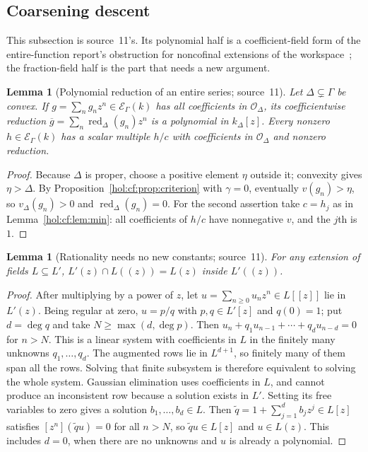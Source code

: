 \documentclass[11pt]{article}
\numberwithin{equation}{section}
\newtheorem{lemma}[theorem]{Lemma}
\theoremstyle{definition}
\theoremstyle{remark}
\newcommand{\EK}{\mathcal E_\Gamma(k)}
\newcommand{\red}{\operatorname{red}}
\begin{document}
\subsection{Coarsening descent}\label{hol:cf:sub:descent}

This subsection is source~11's. Its polynomial half is a coefficient-field
form of the entire-function report's obstruction for noncofinal extensions
of the workspace~\cite{repoentire}; the fraction-field half is the part that
needs a new argument.

\begin{lemma}[Polynomial reduction of an entire series; source~11]
\label{hol:cf:lem:reduction}
Let $\Delta\subsetneq\Gamma$ be convex. If $g=\sum_ng_nz^n\in\EK$ has all
coefficients in $\mathcal O_\Delta$, its coefficientwise reduction
$\overline g=\sum_n\red_\Delta(g_n)z^n$ is a polynomial in $k_\Delta[z]$. Every
nonzero $h\in\EK$ has a scalar multiple $h/c$ with coefficients in
$\mathcal O_\Delta$ and nonzero reduction.
\end{lemma}

\begin{proof}
Because $\Delta$ is proper, choose a positive element $\eta$ outside it;
convexity gives $\eta>\Delta$. By Proposition~\ref{hol:cf:prop:criterion} with
$\gamma=0$, eventually $v(g_n)>\eta$, so $v_\Delta(g_n)>0$ and
$\red_\Delta(g_n)=0$. For the second assertion take $c=h_j$ as in
Lemma~\ref{hol:cf:lem:min}: all coefficients of $h/c$ have nonnegative $v$,
and the $j$th is~$1$.
\end{proof}

\begin{lemma}[Rationality needs no new constants; source~11]
\label{hol:cf:lem:rationaldescent}
For any extension of fields $L\subseteq L'$,
$L'(z)\cap L((z))=L(z)$ inside $L'((z))$.
\end{lemma}

\begin{proof}
After multiplying by a power of $z$, let $u=\sum_{n\ge0}u_nz^n\in L[[z]]$ lie
in $L'(z)$. Being regular at zero, $u=p/q$ with $p,q\in L'[z]$ and $q(0)=1$;
put $d=\deg q$ and take $N\ge\max(d,\deg p)$. Then
$u_n+q_1u_{n-1}+\cdots+q_du_{n-d}=0$ for $n>N$. This is a linear system with
coefficients in $L$ in the finitely many unknowns $q_1,\ldots,q_d$.
The augmented rows lie in $L^{d+1}$, so finitely many of them span all the
rows. Solving that finite subsystem is therefore equivalent to solving the
whole system. Gaussian elimination uses coefficients in $L$, and cannot
produce an inconsistent row because a solution exists in $L'$. Setting its
free variables to zero gives a solution $b_1,\ldots,b_d\in L$.
Then $\widetilde q=1+\sum_{j=1}^d b_jz^j\in L[z]$ satisfies
$[z^n](\widetilde q u)=0$ for all $n>N$, so
$\widetilde q u\in L[z]$ and $u\in L(z)$. This includes $d=0$, when there
are no unknowns and $u$ is already a polynomial.
\end{proof}
\end{document}
